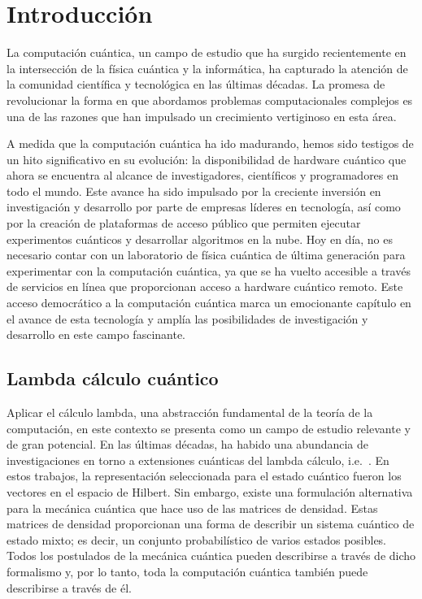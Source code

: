\chapter*{Introducción}

La computación cuántica, un campo de estudio que ha surgido recientemente en la intersección de la física cuántica y la informática, ha capturado la atención de la comunidad científica y tecnológica en las últimas décadas. La promesa de revolucionar la forma en que abordamos problemas computacionales complejos es una de las razones que han impulsado un crecimiento vertiginoso en esta área.


A medida que la computación cuántica ha ido madurando, hemos sido testigos de un hito significativo en su evolución: la disponibilidad de hardware cuántico que ahora se encuentra al alcance de investigadores, científicos y programadores en todo el mundo. Este avance ha sido impulsado por la creciente inversión en investigación y desarrollo por parte de empresas líderes en tecnología, así como por la creación de plataformas de acceso público que permiten ejecutar experimentos cuánticos y desarrollar algoritmos en la nube. Hoy en día, no es necesario contar con un laboratorio de física cuántica de última generación para experimentar con la computación cuántica, ya que se ha vuelto accesible a través de servicios en línea que proporcionan acceso a hardware cuántico remoto. Este acceso democrático a la computación cuántica marca un emocionante capítulo en el avance de esta tecnología y amplía las posibilidades de investigación y desarrollo en este campo fascinante.

\section*{Lambda cálculo cuántico}

Aplicar el cálculo lambda, una abstracción fundamental de la teoría de la computación, en este contexto se presenta como un campo de estudio relevante y de gran potencial. En las últimas décadas, ha habido una abundancia de investigaciones en torno a extensiones cuánticas del lambda cálculo, i.e.\ \cite{van_Tonder_2004, Selinger_2005, high_order_quantum, zorzi_2016, linearlambda, Arrighi_2017, typing_quantum}. En estos trabajos, la representación seleccionada para el estado cuántico fueron los vectores en el espacio de Hilbert. Sin embargo, existe una formulación alternativa para la mecánica cuántica que hace uso de las matrices de densidad. Estas matrices de densidad proporcionan una forma de describir un sistema cuántico de estado mixto; es decir, un conjunto probabilístico de varios estados posibles. Todos los postulados de la mecánica cuántica pueden describirse a través de dicho formalismo y, por lo tanto, toda la computación cuántica también puede describirse a través de él.

